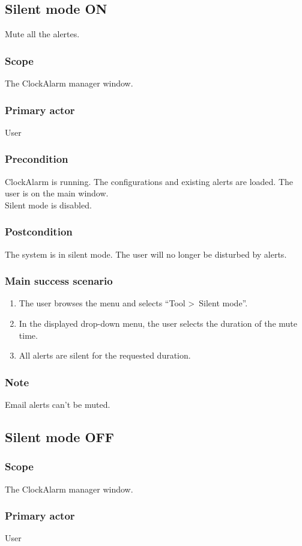 \subsection{Silent mode ON}
Mute all the alertes.
\subsubsection{Scope}
The ClockAlarm manager window.
\subsubsection{Primary actor}
User
\subsubsection{Precondition}
ClockAlarm is running. The configurations and existing alerts are loaded. The user is on the main window.
\\Silent mode is disabled.
\subsubsection{Postcondition}
The system is in silent mode. The user will no longer be disturbed by alerts.
\subsubsection{Main success scenario}
\begin{enumerate}
	\item The user browses the menu and selects ``Tool \textgreater~Silent mode''.
	\item In the displayed drop-down menu, the user selects the duration of the mute time.
	\item All alerts are silent for the requested duration.
\end{enumerate}
\subsubsection{Note}
Email alerts can't be muted.

\subsection{Silent mode OFF}

\subsubsection{Scope}
The ClockAlarm manager window.
\subsubsection{Primary actor}
User
